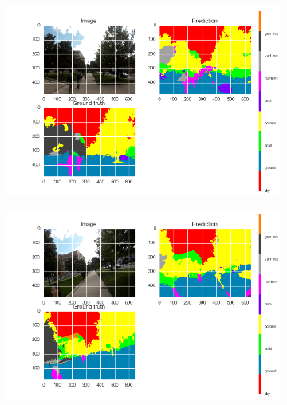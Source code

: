 


\begin{figure}[t]
    \captionsetup[subfigure]{justification=centering}
    \begin{minipage}[c]{.95\textwidth}
        \begin{subfigure}{.47\textwidth}
            \centering
            \includegraphics[trim={13 10mm 25mm 10mm},clip,width=\linewidth]{img/deconvLSTM/gatech_10_204-0.png}
            \caption{}\label{fig:deconvlstm_gatech_samples:a}
        \end{subfigure}%
        \begin{subfigure}{.47\textwidth}
            \centering
            \includegraphics[trim={13 10mm 25mm 10mm},clip,width=\linewidth]{img/deconvLSTM/gatech_10_339-2.png}

\end{subfigure}
\end{minipage}
\end{figure}
